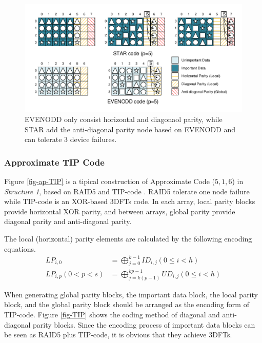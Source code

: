 \documentclass[sigconf]{acmart}
\begin{document}
\begin{figure}[]

\includegraphics[width =\linewidth]{photo/EVENODD-STAR.pdf}

\caption{EVENODD only consist horizontal and diagonaol parity, while STAR add the anti-diagonal parity node based on EVENODD and can tolerate 3 device failures.}\label{fig-star}
\end{figure}

\subsubsection{Approximate TIP Code}

Figure \ref{fig-ap-TIP} is a tipical construction of Approximate Code ($5,1,6$) in \emph{Structure 1}, based on RAID5 and TIP-code \cite{zhang2015tip}. RAID5 tolerate one node failure while TIP-code is an XOR-based 3DFTs code. In each array, local parity blocks provide horizontal XOR parity, and between arrays, global parity provide diagonal parity and anti-diagonal parity. 

The local (horizontal) parity elements are calculated by the following encoding equations.
\begin{align}
    LP_{i,0} &= \bigoplus_{j=0}^{k-1} ID_{i,j} (0 \leqslant i < h)\\
    LP_{i,p}(0<p<s) &= \bigoplus_{j=k(p-1)}^{kp-1} UD_{i,j} (0 \leqslant i < h)
\end{align}

When generating global parity blocks, the important data block, the local parity block, and the global parity block should be arranged as the encoding form of TIP-code. Figure \ref{fig-TIP} shows the coding method of diagonal and anti-diagonal parity blocks.
Since the encoding process of important data blocks can be seen as RAID5 plus TIP-code, it is obvious that they achieve 3DFTs.
\end{document}
